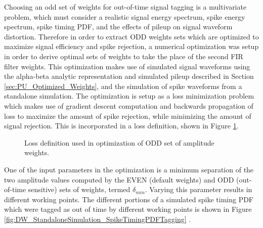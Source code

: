 Choosing an odd set of weights for out-of-time signal tagging is a multivariate problem, which must consider a realistic signal energy spectrum, spike energy spectrum, spike timing PDF, and the effects of pileup on signal waveform distortion. Therefore in order to extract ODD weights sets which are optimized to maximize signal efficiency and spike rejection, a numerical optimization was setup in order to derive optimal sets of weights to take the place of the second FIR filter weights. This optimization makes use of simulated signal waveforms using the alpha-beta analytic representation and simulated pileup described in Section \ref{sec:PU_Optimized_Weights}, and the simulation of spike waveforms from a standalone simulation. The optimization is setup as a loss minimization problem which makes use of gradient descent computation and backwards propagation of loss to maximize the amount of spike rejection, while minimizing the amount of signal rejection. This is incorporated in a loss definition, shown in Figure \ref{fig:NumOptLoss}.

\begin{figure}[H]%
    \setcounter{subfigure}{0} %
    \centering
    \hfill
    \hfill
    \caption{Loss definition used in optimization of ODD set of amplitude weights.}%
    \label{fig:NumOptLoss}
\end{figure}  

One of the input parameters in the optimization is a minimum separation of the two amplitude values computed by the EVEN (default weights) and ODD (out-of-time sensitive) sets of weights, termed $\delta_{min}$. Varying this parameter results in different working points. The different portions of a simulated spike timing PDF which were tagged as out of time by different working points is shown in Figure \ref{fig:DW_StandaloneSimulation_SpikeTimingPDFTagging} \cite{CMS-DP-2022-007, CMS-DP-2022-007_Plots}. 

